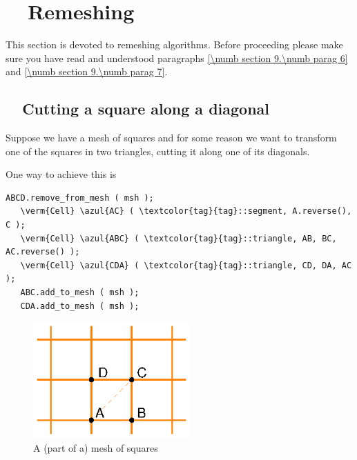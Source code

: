 
\chapter{~~Remeshing}\label{\numb section 10}

This section is devoted to remeshing algorithms.
Before proceeding please make sure you have read and understood paragraphs
\ref{\numb section 9.\numb parag 6} and \ref{\numb section 9.\numb parag 7}.


\section{~~Cutting a square along a diagonal}\label{\numb section 10.\numb parag 1}

Suppose we have a mesh of squares and for some reason we want to transform one of the
squares in two triangles, cutting it along one of its diagonals.

One way to achieve this is

\begin{Verbatim}[commandchars=\\\{\},formatcom=\small\tt,frame=single,
   label=parag-\ref{\numb section 10.\numb parag 1}.cpp,rulecolor=\color{coment},
   baselinestretch=0.94,framesep=2mm]
   ABCD.remove_from_mesh ( msh );
   \verm{Cell} \azul{AC} ( \textcolor{tag}{tag}::segment, A.reverse(), C );
   \verm{Cell} \azul{ABC} ( \textcolor{tag}{tag}::triangle, AB, BC, AC.reverse() );
   \verm{Cell} \azul{CDA} ( \textcolor{tag}{tag}::triangle, CD, DA, AC );
   ABC.add_to_mesh ( msh );
   CDA.add_to_mesh ( msh );
\end{Verbatim}

\begin{figure}[ht] \centering
  \includegraphics[width=60mm]{malha-quadr}
  \caption{A (part of a) mesh of squares}
  \label{\numb section 10.\numb fig 1}
\end{figure}

